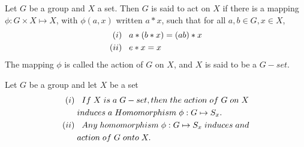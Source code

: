 \begin{defi}
    Let $G$ be a group and $X$ a set. Then $G$ is said to act on $X$ if there is a mapping $\phi:G\times X\mapsto X$, with $\phi(a,x)$ written $a*x$, such that for all $a,b\in G, x\in X$,
    \begin{align*}
        (i)&\hspace{.3cm}a*(b*x)=(ab)*x\\
        (ii)&\hspace{.3cm}e*x=x\\
    \end{align*}
    The mapping $\phi$ is called the action of $G$ on $X$, and $X$ is said to be a $G-set$.
\end{defi}
\begin{teo}
    Let $G$ be a group and let $X$ be a set
    \begin{align*}
        (i)&\hspace{.3cm}If\hspace{.1cm}X\hspace{.1cm}is\hspace{.1cm}a\hspace{.1cm}G-set,then\hspace{.1cm}the\hspace{.1cm}action\hspace{.1cm}of\hspace{.1cm}G\hspace{.1cm}on\hspace{.1cm}X\\
        &\hspace{.1cm}induces\hspace{.1cm}a\hspace{.1cm}Homomorphism\hspace{.1cm}\phi:G\mapsto S_x.\\
        (ii)&\hspace{.3cm}Any\hspace{.1cm}homomorphism\hspace{.1cm}\phi:G\mapsto S_x\hspace{.1cm}induces\hspace{.1cm}and\\
        &\hspace{.1cm}action\hspace{.1cm}of\hspace{.1cm}G\hspace{.1cm}onto\hspace{.1cm}X.
    \end{align*}
\end{teo}

